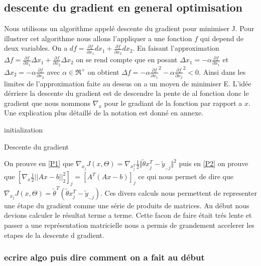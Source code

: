 \documentclass[a4paper,10pt]{article}
\begin{document}
\subsection{descente du gradient en general optimisation}
Nous utilisons un algorithme appelé descente du gradient pour minimiser J. Pour illustrer cet algorithme nous allons l'appliquer 
a une fonction $f$ qui depend de deux variables.%
 On a $df = \frac{\partial f}{\partial x_{1}}d x_{1} + \frac{\partial f}{\partial x_{2}}dx_{2}$. En faisant l'approximation
 $\Delta f = \frac{\partial f}{\partial x_{1}}\Delta  x_{1} + \frac{\partial f}{\partial x_{2}}\Delta x_{2}$ on se rend compte
 que en posant $\Delta x_{1} = -\alpha \frac{\partial f}{\partial x_{1}}$
 et $\Delta x_{2} = -\alpha \frac{\partial f}{\partial x_{2}}$ avec $\alpha \in \Re^{+}$
 on obtient $\Delta f = -\alpha \frac{\partial f}{\partial x_{1}}^{2} - \alpha \frac{\partial f}{\partial x_{2}}^{2} < 0$. Ainsi dans
 les limites de l'approximation faite au dessus on a un moyen de minimiser E.
L'idée dérriere la descente du gradient 
est de descendre la pente de al fonction donc le gradient que nous nommons $\nabla_{x}$ pour le gradiant de la fonction par rapport 
a $x$. Une explication plus détaillé de la notation est donné en annexe.  
 
\begin{algorithm}[H]
 initialization\;
 \caption{Descente du gradient}
\end{algorithm}
On prouve en \ref{P1} que $ \nabla_{x_{j}}J(x, \Theta) = \nabla_{x_{j}^T}\frac{1}{2}\Vert\tilde{\theta}x_{j}^{T}-\tilde{y}_{.,j}\Vert^{2}$
puis en \ref{P2} on prouve que $[\nabla_{x} \frac{1}{2}||Ax - b||^{2}_{2}]_{j} = [A^{T}(Ax - b)]_{j}$ ce qui nous permet de dire
que $ \nabla_{x_{j}}J(x, \Theta) =  \tilde{\theta}^{T}(\tilde{\theta}x_{j}^{T}-\tilde{y}_{.,j})$. Ces divers calculs nous permettent
de representer une étape du gradient comme une série de produits de matrices. Au début nous devions calculer le résultat terme a terme. Cette
facon de faire était trés lente et passer a une représentation matricielle nous a permis de grandement accelerer les etapes de la descente d gradient.
\subsubsection{ecrire algo puis dire comment on a fait au début}
\end{document}
